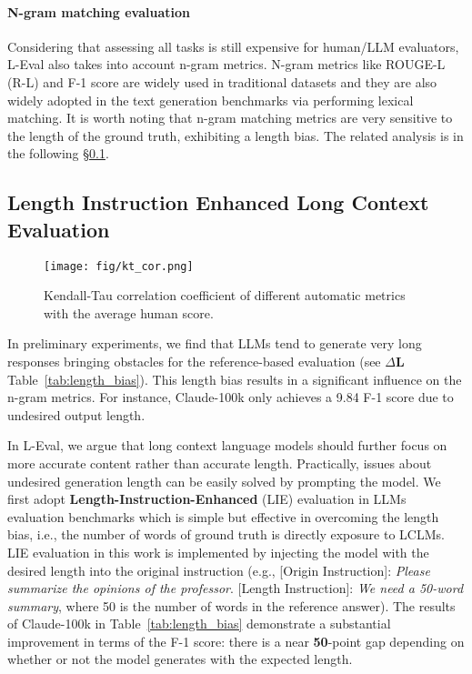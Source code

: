 \vspace{-0.7em}
\paragraph{N-gram matching evaluation}
Considering that assessing all tasks is still expensive for human/LLM evaluators, L-Eval also takes into account n-gram metrics. 
N-gram metrics like ROUGE-L (R-L) and F-1 score are widely used in traditional datasets and they are also widely adopted in the text generation benchmarks via performing lexical matching. It is worth noting that n-gram matching metrics are very sensitive to the length of the ground truth, exhibiting a length bias. The related analysis is in the following \S\ref{sec:length-instruction}.

\subsection{Length Instruction Enhanced Long Context Evaluation}
\label{sec:length-instruction}

\begin{wrapfigure}{r}{0.4\textwidth}
  \centering
  \vspace{-6mm}
  \texttt{[image: fig/kt\_cor.png]}
  \caption{Kendall-Tau correlation coefficient of different automatic metrics with the average human score.}
  \label{fig:cor}
  \vspace{-5mm}
\end{wrapfigure}
In preliminary experiments, we find that LLMs tend to generate very long responses bringing obstacles for the reference-based evaluation (see $\Delta$\textbf{L} Table~\ref{tab:length_bias}). This length bias results in a significant influence on the n-gram metrics. For instance, Claude-100k only achieves a 9.84 F-1 score due to undesired output length.

In L-Eval, we argue that long context language models should further focus on more accurate content rather than accurate length. Practically, issues about undesired generation length can be easily solved by prompting the model.  We first adopt \textbf{Length-Instruction-Enhanced} (LIE) evaluation in LLMs evaluation benchmarks which is simple but effective in overcoming the length bias, i.e., the number of words of ground truth is directly exposure to LCLMs. 
LIE evaluation in this work is implemented by injecting the model with the desired length into the original instruction (e.g., [Origin Instruction]: \textit{Please summarize the opinions of the professor}. [Length Instruction]: \textit{We need a 50-word summary}, where 50 is the number of words in the reference answer). The results of Claude-100k in Table~\ref{tab:length_bias} demonstrate a substantial improvement in terms of the F-1 score: there is a near \textbf{50}-point gap depending on whether or not the model generates with the expected length.

